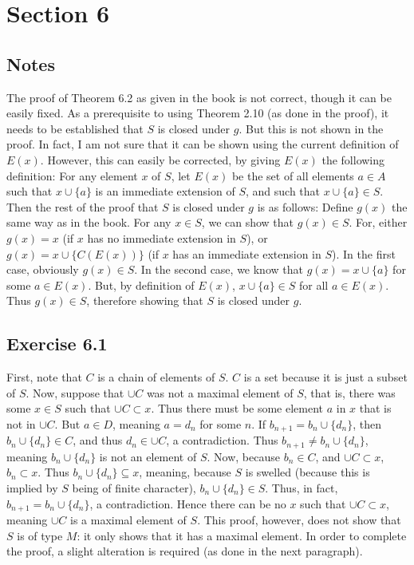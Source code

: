 \documentclass{article}
\theoremstyle{definition}
\begin{document}
\section*{Section 6}

\subsection*{Notes}
The proof of Theorem 6.2 as given in the book is not correct, though it can be easily fixed. As a prerequisite to using Theorem 2.10 (as done 
in the proof), it needs to be established that $S$ is closed under $g$. But this is not shown in the proof. In fact, I am not sure that it can be 
shown using the current definition of $E(x)$. However, this can easily be corrected, by giving $E(x)$ the following definition: 
For any element $x$ of $S$, let $E(x)$ be the set of all elements $a\in A$ such that $x\cup\{a\}$ is an immediate extension of $S$, 
and such that $x\cup\{a\}\in S$. Then the rest of the proof that $S$ is closed under $g$ is as follows: 
Define $g(x)$ the same way as in the book. For any $x\in S$, we 
can show that $g(x)\in S$. For, either $g(x)=x$ (if $x$ has no immediate extension in $S$), or 
$g(x)=x\cup\{C(E(x))\}$ (if $x$ has an immediate extension in $S$). In the first case, obviously $g(x)\in S$. In the second case, 
we know that $g(x)=x\cup\{a\}$ for some $a\in E(x)$. But, by definition of $E(x)$, $x\cup\{a\}\in S$ for all $a\in E(x)$. Thus $g(x)\in S$, 
therefore showing that $S$ is closed under $g$.

\subsection*{Exercise 6.1}
First, note that $C$ is a chain of elements of $S$. $C$ is a set because it is just a subset of $S$. Now, suppose that $\cup C$ was not a 
maximal element of $S$, that is, there was some $x\in S$ such that $\cup C\subset x$. Thus there must be some element $a$ in 
$x$ that is not in $\cup C$. But $a\in D$, meaning $a=d_n$ for some $n$. If $b_{n+1}=b_n\cup\{d_n\}$, then $b_n\cup\{d_n\}\in C$, and 
thus $d_n\in\cup C$, a contradiction. Thus $b_{n+1}\ne b_n\cup\{d_n\}$, meaning $b_n\cup\{d_n\}$ is not an element of 
$S$. Now, because $b_n\in C$, and $\cup C\subset x$, $b_n\subset x$. Thus $b_n\cup\{d_n\}\subseteq x$, meaning, because 
$S$ is swelled (because this is implied by $S$ being of finite character), $b_n\cup\{d_n\}\in S$. 
Thus, in fact, $b_{n+1}=b_n\cup\{d_n\}$, a contradiction. Hence there can be no 
$x$ such that $\cup C\subset x$, meaning $\cup C$ is a maximal element of $S$. This proof, however, does not show that $S$ is 
of type $M$: it only shows that it has a maximal element. In order to complete the proof, a slight alteration is required (as done in the next paragraph).
\end{document}

